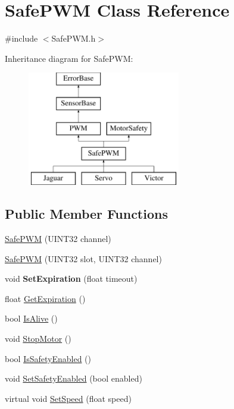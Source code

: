 \hypertarget{classSafePWM}{\section{\-Safe\-P\-W\-M \-Class \-Reference}
\label{classSafePWM}
}


{\ttfamily \#include $<$\-Safe\-P\-W\-M.\-h$>$}

\-Inheritance diagram for \-Safe\-P\-W\-M\-:\begin{figure}[H]
\begin{center}
\leavevmode
\includegraphics[height=5.000000cm]{classSafePWM}
\end{center}
\end{figure}
\subsection*{\-Public \-Member \-Functions}
\begin{DoxyCompactItemize}
\item 
\hyperlink{classSafePWM_a00a1366b4da440711a1f02d037950a2f}{\-Safe\-P\-W\-M} (\-U\-I\-N\-T32 channel)
\item 
\hyperlink{classSafePWM_a06eacc9ee214214cf8a7f0ac9650d59b}{\-Safe\-P\-W\-M} (\-U\-I\-N\-T32 slot, \-U\-I\-N\-T32 channel)
\item 
\hypertarget{classSafePWM_a30ee2880db771df845a8fe47f3184953}{void {\bfseries \-Set\-Expiration} (float timeout)}\label{classSafePWM_a30ee2880db771df845a8fe47f3184953}

\item 
float \hyperlink{classSafePWM_a81eae699cc4663f0812dfb7737c56281}{\-Get\-Expiration} ()
\item 
bool \hyperlink{classSafePWM_aebfc9f69eff62ed8180c2991b25ad043}{\-Is\-Alive} ()
\item 
void \hyperlink{classSafePWM_a66a27761982521795879b6067d81a6dc}{\-Stop\-Motor} ()
\item 
bool \hyperlink{classSafePWM_a8303289bd3ecd52d7764f7bb593a3474}{\-Is\-Safety\-Enabled} ()
\item 
void \hyperlink{classSafePWM_a882453a32c881e9114623072b7d905e5}{\-Set\-Safety\-Enabled} (bool enabled)
\item 
virtual void \hyperlink{classSafePWM_af1ed936d88f3ee6446b01c17feb24b78}{\-Set\-Speed} (float speed)
\end{DoxyCompactItemize}


